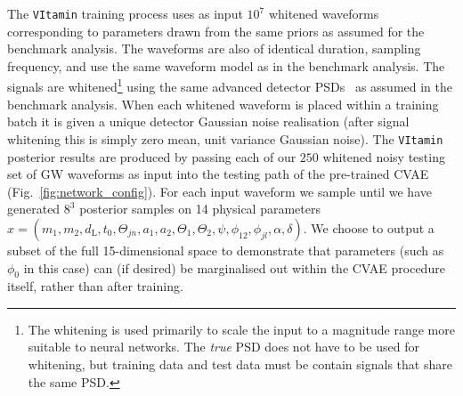 \documentclass[%
showpacs,
nofootinbib,
 amsmath,amssymb,
 aps,
 twocolumn,
 prl,
 reprint,
floatfix,
]{revtex4-1}
\begin{document}
%
%
The \texttt{VItamin} training process uses as input $10^{7}$ whitened
waveforms corresponding to parameters drawn from the same priors as assumed for
the benchmark analysis. The waveforms are also of identical duration, sampling
frequency, and use the same waveform model as in the benchmark analysis.
The signals are whitened\footnote{The whitening is used primarily to
scale the input to a magnitude range more suitable to neural networks. The
\emph{true} \ac{PSD} does not have to be used for whitening, but training data
and test data must be contain signals that share the same \ac{PSD}.}
using the same advanced detector \acp{PSD}~\cite{aligo_noisecurves} as
assumed in the benchmark analysis. When each whitened waveform is placed
within a training batch it is given a unique detector Gaussian noise
realisation (after signal whitening this is simply zero mean, unit
variance Gaussian noise). The \texttt{VItamin} posterior results are produced by
passing each of our $250$ whitened noisy testing set of \ac{GW} waveforms
as input into the testing path of the pre-trained
\ac{CVAE} (Fig.~\ref{fig:network_config}). For each input waveform we sample until we
have generated $8^3$ posterior samples on 14 physical parameters
$x=(m_1,m_2,d_{\text{L}},t_{0},\Theta_{jn},a_1,a_2,\Theta_1,\Theta_2,\psi,
\phi_{12},\phi_{jl},\alpha,\delta)$. We choose to
output a subset of the full 15-dimensional space to demonstrate that parameters
(such as $\phi_0$ in this case) can (if desired) be
marginalised out within the \ac{CVAE} procedure itself, rather than after
training. 
\end{document}
